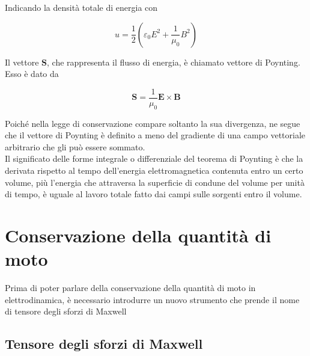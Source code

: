 Indicando la densità totale di energia con 

\begin{tcolorbox}[colback=yellow!10!white, colframe=orange!70!black, boxrule=0.8pt]
\begin{equation} \label{eq: densità_totale_energia}
    u = \frac{1}{2} \left( \varepsilon_0 E^2 + \frac{1}{\mu_0} B^2 \right)
\end{equation}
\end{tcolorbox}

Il vettore $\mathbf{S}$, che rappresenta il flusso di energia, è chiamato vettore di Poynting.  Esso è dato da

\begin{tcolorbox}[colback=yellow!10!white, colframe=orange!70!black, boxrule=0.8pt]
\begin{equation} \label{eq: vettore_Poynting}
    \mathbf{S} = \frac{1}{\mu_0} \mathbf{E} \times \mathbf{B}
\end{equation}
\end{tcolorbox}

Poiché nella legge di conservazione compare soltanto la sua divergenza, ne segue che il vettore di Poynting è definito a meno del gradiente di una campo vettoriale arbitrario che gli può essere sommato. \\

Il significato delle forme integrale o differenziale del teorema di Poynting è che la derivata rispetto al tempo dell'energia elettromagnetica contenuta entro un certo volume, più l'energia che attraversa la superficie di condune del volume per unità di tempo, è uguale al lavoro totale fatto dai campi sulle sorgenti entro il volume. 

\newpage

\section{Conservazione della quantità di moto}

Prima di poter parlare della conservazione della quantità di moto in elettrodinamica, è necessario introdurre un nuovo strumento che prende il nome di tensore degli sforzi di Maxwell

\subsection{Tensore degli sforzi di Maxwell}

